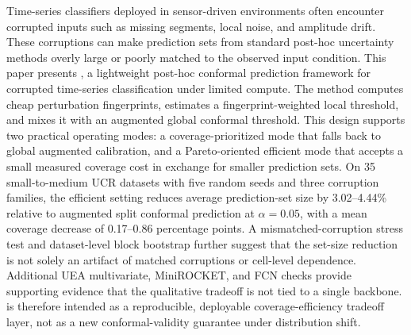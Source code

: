 Time-series classifiers deployed in sensor-driven environments often encounter corrupted inputs such as missing segments, local noise, and amplitude drift. These corruptions can make prediction sets from standard post-hoc uncertainty methods overly large or poorly matched to the observed input condition. This paper presents \fastcp, a lightweight post-hoc conformal prediction framework for corrupted time-series classification under limited compute. The method computes cheap perturbation fingerprints, estimates a fingerprint-weighted local threshold, and mixes it with an augmented global conformal threshold. This design supports two practical operating modes: a coverage-prioritized mode that falls back to global augmented calibration, and a Pareto-oriented efficient mode that accepts a small measured coverage cost in exchange for smaller prediction sets. On 35 small-to-medium UCR datasets with five random seeds and three corruption families, the efficient setting reduces average prediction-set size by 3.02--4.44\% relative to augmented split conformal prediction at $\alpha=0.05$, with a mean coverage decrease of 0.17--0.86 percentage points. A mismatched-corruption stress test and dataset-level block bootstrap further suggest that the set-size reduction is not solely an artifact of matched corruptions or cell-level dependence. Additional UEA multivariate, MiniROCKET, and FCN checks provide supporting evidence that the qualitative tradeoff is not tied to a single backbone. \fastcp{} is therefore intended as a reproducible, deployable coverage-efficiency tradeoff layer, not as a new conformal-validity guarantee under distribution shift.
